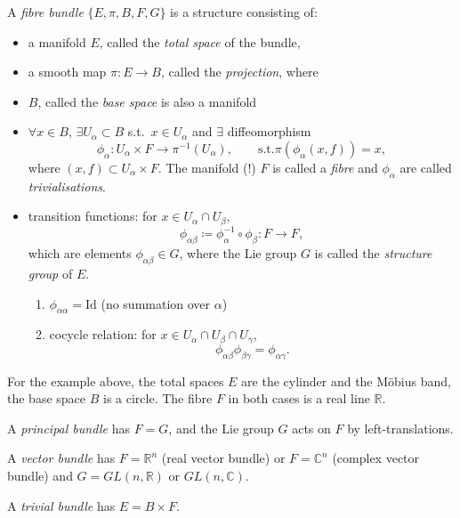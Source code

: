 \begin{definition}
  A \emph{fibre bundle} $\{E, \pi, B, F, G\}$ is a structure consisting of:
  \begin{itemize}
    \item a manifold $E$, called the \emph{total space} of the bundle,
    \item a smooth map $\pi \colon E \to B$, called the \emph{projection}, where
    \item $B$, called the \emph{base space} is also a manifold
    \item $\forall x \in B$, $\exists U_{\alpha} \subset B$ s.t.~$x \in U_{\alpha}$ and $\exists$ diffeomorphism 
      \begin{equation}
	\phi_{\alpha} \colon U_{\alpha} \times F \to \pi^{-1}(U_{\alpha}), \qquad \text{s.t.} \pi(\phi_{\alpha}(x, f)) = x,
      \end{equation}
      where $(x, f) \subset U_{\alpha} \times F$.
      The manifold (!) $F$ is called a \emph{fibre} and $\phi_{\alpha}$ are called \emph{trivialisations}.
    \item transition functions: for $x \in U_{\alpha} \cap U_{\beta}$,
      \begin{equation}
        \phi_{\alpha\beta} \coloneqq \phi^{-1}_{\alpha} \circ \phi_{\beta} \colon F \to F,
      \end{equation}
      which are elements $\phi_{\alpha\beta} \in G$, where the Lie group $G$ is called the \emph{structure group} of $E$.
      \begin{enumerate}[1)]
	\item $\phi_{\alpha\alpha} = \text{Id}$ (no summation over $\alpha$)
	\item cocycle relation: for $x \in U_{\alpha} \cap U_{\beta} \cap U_{\gamma}$,
	  \begin{equation}
	    \phi_{\alpha\beta} \phi_{\beta\gamma} = \phi_{\alpha\gamma}.
	  \end{equation}
      \end{enumerate}
  \end{itemize}
\end{definition}

For the example above, the total spaces $E$ are the cylinder and the Möbius band, the base space $B$ is a circle.
The fibre $F$ in both cases is a real line $\mathbb{R}$.

\begin{definition}
  A \emph{principal bundle} has $F = G$, and the Lie group $G$ acts on $F$ by left-translations.
\end{definition}
\begin{definition}
  A \emph{vector bundle} has $F = \mathbb{R}^n$ (real vector bundle) or $F = \mathbb{C}^n$ (complex vector bundle) and $G = GL(n, \mathbb{R})$ or $GL(n, \mathbb{C})$.
\end{definition}
\begin{definition}
  A \emph{trivial bundle} has $E = B \times F$.
\end{definition}

